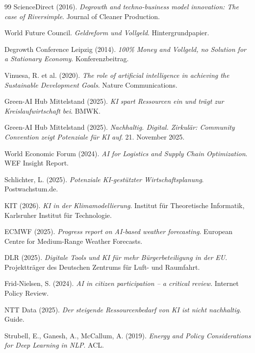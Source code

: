 \documentclass[12pt, a4paper]{article}
\begin{document}
\begin{thebibliography}{99}
		ScienceDirect (2016). \textit{Degrowth and techno-business model innovation: The case of Riversimple}. Journal of Cleaner Production.
		
		World Future Council. \textit{Geldreform und Vollgeld}. Hintergrundpapier.
		
		Degrowth Conference Leipzig (2014). \textit{100\% Money and Vollgeld, no Solution for a Stationary Economy}. Konferenzbeitrag.
		
		Vinuesa, R. et al. (2020). \textit{The role of artificial intelligence in achieving the Sustainable Development Goals}. Nature Communications.
		
		Green-AI Hub Mittelstand (2025). \textit{KI spart Ressourcen ein und trägt zur Kreislaufwirtschaft bei}. BMWK.
		
		Green-AI Hub Mittelstand (2025). \textit{Nachhaltig. Digital. Zirkulär: Community Convention zeigt Potenziale für KI auf}. 21. November 2025.
		
		World Economic Forum (2024). \textit{AI for Logistics and Supply Chain Optimization}. WEF Insight Report.
		
		Schlichter, L. (2025). \textit{Potenziale KI-gestützter Wirtschaftsplanung}. Postwachstum.de.
		
		KIT (2026). \textit{KI in der Klimamodellierung}. Institut für Theoretische Informatik, Karlsruher Institut für Technologie.
		
		ECMWF (2025). \textit{Progress report on AI-based weather forecasting}. European Centre for Medium-Range Weather Forecasts.
		
		DLR (2025). \textit{Digitale Tools und KI für mehr Bürgerbeteiligung in der EU}. Projektträger des Deutschen Zentrums für Luft- und Raumfahrt.
		
		Frid-Nielsen, S. (2024). \textit{AI in citizen participation – a critical review}. Internet Policy Review.
		
		NTT Data (2025). \textit{Der steigende Ressourcenbedarf von KI ist nicht nachhaltig}. Guide.
		
		Strubell, E., Ganesh, A., McCallum, A. (2019). \textit{Energy and Policy Considerations for Deep Learning in NLP}. ACL.
		

\end{thebibliography}
\end{document}

